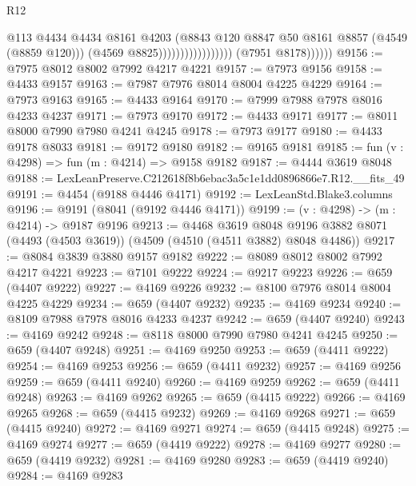 \begin{lexlean}{R12}
\begin{coremodule}
                                              @113
                                              @4434
                                              @4434
                                              @8161
                                              @4203
                                              (@8843
                                                @120
                                                @8847
                                                @50
                                                @8161
                                                @8857
                                                (@4549 (@8859 @120)))
                                              (@4569 @8825)))))))))))))))))
              (@7951 @8178))))))
@9156 := @7975 @8012 @8002 @7992 @4217 @4221
@9157 := @7973 @9156
@9158 := @4433 @9157
@9163 := @7987 @7976 @8014 @8004 @4225 @4229
@9164 := @7973 @9163
@9165 := @4433 @9164
@9170 := @7999 @7988 @7978 @8016 @4233 @4237
@9171 := @7973 @9170
@9172 := @4433 @9171
@9177 := @8011 @8000 @7990 @7980 @4241 @4245
@9178 := @7973 @9177
@9180 := @4433 @9178 @8033
@9181 := @9172 @9180
@9182 := @9165 @9181
@9185 := fun (v : @4298) => fun (m : @4214) => @9158 @9182
@9187 := @4444 @3619 @8048
@9188 := LexLeanPreserve.C212618f8b6ebac3a5c1e1dd0896866e7.R12.__fits_49
@9191 := @4454 (@9188 @4446 @4171)
@9192 := LexLeanStd.Blake3.columns
@9196 := @9191 (@8041 (@9192 @4446 @4171))
@9199 := (v : @4298) -> (m : @4214) -> @9187 @9196
@9213 := @4468
    @3619
    @8048
    @9196
    @3882
    @8071
    (@4493 (@4503 @3619))
    (@4509 (@4510 (@4511 @3882) @8048 @4486))
@9217 := @8084 @3839 @3880 @9157 @9182
@9222 := @8089 @8012 @8002 @7992 @4217 @4221
@9223 := @7101 @9222
@9224 := @9217 @9223
@9226 := @659 (@4407 @9222)
@9227 := @4169 @9226
@9232 := @8100 @7976 @8014 @8004 @4225 @4229
@9234 := @659 (@4407 @9232)
@9235 := @4169 @9234
@9240 := @8109 @7988 @7978 @8016 @4233 @4237
@9242 := @659 (@4407 @9240)
@9243 := @4169 @9242
@9248 := @8118 @8000 @7990 @7980 @4241 @4245
@9250 := @659 (@4407 @9248)
@9251 := @4169 @9250
@9253 := @659 (@4411 @9222)
@9254 := @4169 @9253
@9256 := @659 (@4411 @9232)
@9257 := @4169 @9256
@9259 := @659 (@4411 @9240)
@9260 := @4169 @9259
@9262 := @659 (@4411 @9248)
@9263 := @4169 @9262
@9265 := @659 (@4415 @9222)
@9266 := @4169 @9265
@9268 := @659 (@4415 @9232)
@9269 := @4169 @9268
@9271 := @659 (@4415 @9240)
@9272 := @4169 @9271
@9274 := @659 (@4415 @9248)
@9275 := @4169 @9274
@9277 := @659 (@4419 @9222)
@9278 := @4169 @9277
@9280 := @659 (@4419 @9232)
@9281 := @4169 @9280
@9283 := @659 (@4419 @9240)
@9284 := @4169 @9283

\end{coremodule}
\end{lexlean}
